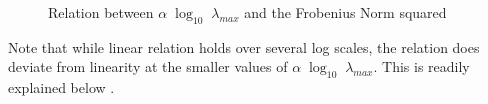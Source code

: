 { \begin{figure}[!htb]
    \centering
        \caption{Relation between $\alpha\;\log_{10}\;\lambda_{max}$ and the Frobenius Norm squared }
    \label{fig:relations}
\end{figure}


Note that while linear relation holds over several log scales, 
the relation does deviate from linearity at the smaller values of $\alpha\;\log_{10}\;\lambda_{max}$.
This is readily explained below .  }



